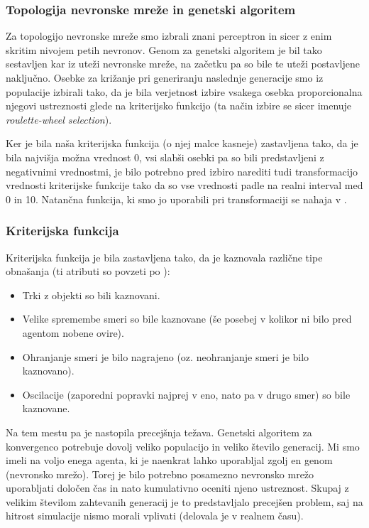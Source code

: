 \documentclass[a4paper,10pt]{article}
\begin{document}
\subsubsection{Topologija nevronske mreže in genetski algoritem}
Za topologijo nevronske mreže smo izbrali znani perceptron in sicer z enim skritim nivojem petih nevronov. Genom za genetski algoritem je bil tako sestavljen kar iz uteži nevronske mreže, na začetku pa so bile te uteži postavljene naključno. Osebke za križanje pri generiranju naslednje generacije smo iz populacije izbirali tako, da je bila verjetnost izbire vsakega osebka proporcionalna njegovi ustreznosti glede na kriterijsko funkcijo (ta način izbire se sicer imenuje \textit{roulette-wheel selection}).

Ker je bila naša kriterijska funkcija (o njej malce kasneje) zastavljena tako, da je bila najvišja možna vrednost 0, vsi slabši osebki pa so bili predstavljeni z negativnimi vrednostmi, je bilo potrebno pred izbiro narediti tudi transformacijo vrednosti kriterijske funkcije tako da so vse vrednosti padle na realni interval med 0 in 10. Natančna funkcija, ki smo jo uporabili pri transformaciji se nahaja v \cite{seymour08}.

\subsubsection{Kriterijska funkcija}
Kriterijska funkcija je bila zastavljena tako, da je kaznovala različne tipe obnašanja (ti atributi so povzeti po \cite{champandard02}):
\begin{itemize}
  \item Trki z objekti so bili kaznovani.
  \item Velike spremembe smeri so bile kaznovane (še posebej v kolikor ni bilo pred agentom nobene ovire).
  \item Ohranjanje smeri je bilo nagrajeno (oz. neohranjanje smeri je bilo kaznovano).
  \item Oscilacije (zaporedni popravki najprej v eno, nato pa v drugo smer) so bile kaznovane.
\end{itemize}

Na tem mestu pa je nastopila precejšnja težava. Genetski algoritem za konvergenco potrebuje dovolj veliko populacijo in veliko število generacij. Mi smo imeli na voljo enega agenta, ki je naenkrat lahko uporabljal zgolj en genom (nevronsko mrežo). Torej je bilo potrebno posamezno nevronsko mrežo uporabljati določen čas in nato kumulativno oceniti njeno ustreznost. Skupaj z velikim številom zahtevanih generacij je to predstavljalo precejšen problem, saj na hitrost simulacije nismo morali vplivati (delovala je v realnem času).
\end{document}
